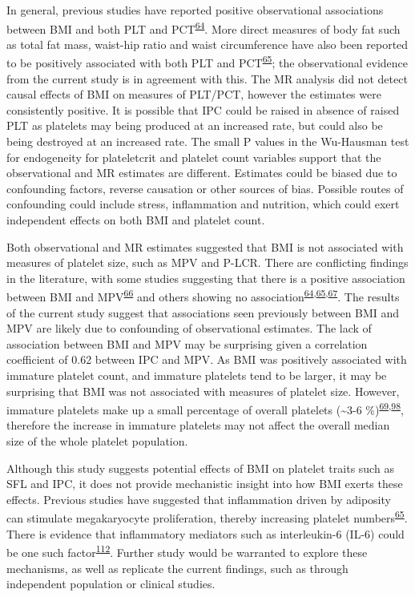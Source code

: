 \documentclass[11pt,twoside]{bristolthesis}
\begin{document}
In general, previous studies have reported positive observational associations between BMI and both PLT and PCT\textsuperscript{\protect\hyperlink{ref-Furuncuoglu2016}{64}}. More direct measures of body fat such as total fat mass, waist-hip ratio and waist circumference have also been reported to be positively associated with both PLT and PCT\textsuperscript{\protect\hyperlink{ref-Han2018a}{65}}; the observational evidence from the current study is in agreement with this. The MR analysis did not detect causal effects of BMI on measures of PLT/PCT, however the estimates were consistently positive. It is possible that IPC could be raised in absence of raised PLT as platelets may being produced at an increased rate, but could also be being destroyed at an increased rate. The small P values in the Wu-Hausman test for endogeneity for plateletcrit and platelet count variables support that the observational and MR estimates are different. Estimates could be biased due to confounding factors, reverse causation or other sources of bias. Possible routes of confounding could include stress, inflammation and nutrition, which could exert independent effects on both BMI and platelet count.

Both observational and MR estimates suggested that BMI is not associated with measures of platelet size, such as MPV and P-LCR. There are conflicting findings in the literature, with some studies suggesting that there is a positive association between BMI and MPV\textsuperscript{\protect\hyperlink{ref-Coban2005}{66}} and others showing no association\textsuperscript{\protect\hyperlink{ref-Furuncuoglu2016}{64},\protect\hyperlink{ref-Han2018a}{65},\protect\hyperlink{ref-Heffron2018}{67}}. The results of the current study suggest that associations seen previously between BMI and MPV are likely due to confounding of observational estimates. The lack of association between BMI and MPV may be surprising given a correlation coefficient of 0.62 between IPC and MPV. As BMI was positively associated with immature platelet count, and immature platelets tend to be larger, it may be surprising that BMI was not associated with measures of platelet size. However, immature platelets make up a small percentage of overall platelets (\textasciitilde3-6 \%)\textsuperscript{\protect\hyperlink{ref-Ibrahim2014}{69},\protect\hyperlink{ref-Bernlochner2015a}{98}}, therefore the increase in immature platelets may not affect the overall median size of the whole platelet population.

Although this study suggests potential effects of BMI on platelet traits such as SFL and IPC, it does not provide mechanistic insight into how BMI exerts these effects. Previous studies have suggested that inflammation driven by adiposity can stimulate megakaryocyte proliferation, thereby increasing platelet numbers\textsuperscript{\protect\hyperlink{ref-Han2018a}{65}}. There is evidence that inflammatory mediators such as interleukin-6 (IL-6) could be one such factor\textsuperscript{\protect\hyperlink{ref-Kaser2001}{112}}. Further study would be warranted to explore these mechanisms, as well as replicate the current findings, such as through independent population or clinical studies.
\end{document}
